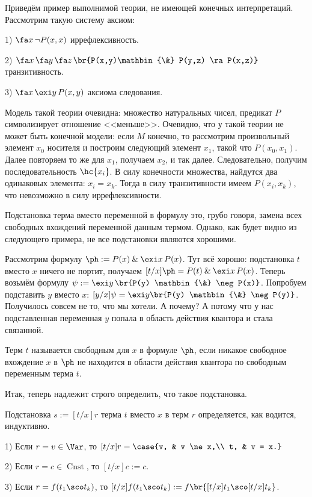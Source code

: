 \documentclass[a4paper,draft]{article}
\let\amper\&
\def\&{\mathbin{\amper}}
\def\exis#1{\exi#1\,}
\def\fora#1{\fa#1\,}
\DeclareMathOperator{\Cnst}{Cnst}
\begin{document}
\begin{ex}
  Приведём пример выполнимой теории, не имеющей конечных интерпретаций. Рассмотрим такую систему аксиом:

  1) $\fora{x} \neg P(x,x)$ иррефлексивность.

  2) $\fora{x}\fora{y}\fora{z} \br{P(x,y)\& P(y,z) \ra P(x,z)}$ транзитивность.

  3) $\fora{x}\exis{y} P(x,y)$ аксиома следования.

  Модель такой теории очевидна: множество натуральных чисел, предикат $P$ символизирует отношение <<меньше>>.
  Очевидно, что у такой теории не может быть конечной модели: если $M$ конечно, то рассмотрим произвольный элемент $x_0$
  носителя и построим следующий элемент $x_1$, такой что $P(x_0,x_1)$. Далее повторяем то же для $x_1$,
  получаем $x_2$, и так далее. Следовательно, получим последовательность $\hc{x_i}$. В силу конечности множества,
  найдутся два одинаковых элемента: $x_i = x_k$. Тогда в силу транзитивности имеем $P(x_i, x_k)$,
  что невозможно в силу иррефлексивности.
\end{ex}


Подстановка терма вместо переменной в формулу это, грубо говоря, замена всех свободных
вхождений переменной данным термом. Однако, как будет видно из следующего примера,
не все подстановки являются хорошими.

\begin{ex}
  Рассмотрим формулу $\ph := P(x) \& \exis{x} P(x)$. Тут всё хорошо: подстановка $t$ вместо $x$ ничего не портит,
  получаем $[t/x] \ph = P(t) \& \exis{x} P(x)$.   Теперь возьмём формулу $\psi := \exis{y}\br{P(y) \& \neg P(x)}$.
  Попробуем подставить $y$ вместо $x$: $[y/x]\psi = \exi y\br{P(y) \& \neg P(y)}$.
  Получилось совсем не то, что мы хотели. А почему? А потому что у нас подставленная переменная $y$ попала в область действия
  квантора и стала связанной.
\end{ex}

\begin{df}
  Терм $t$ называется свободным для $x$ в формуле $\ph$, если никакое свободное вхождение $x$ в $\ph$
  не находится в области действия квантора по свободным переменным терма $t$.
\end{df}

Итак, теперь надлежит строго определить, что такое подстановка.

\begin{df}
  Подстановка $s := [t/x]r$ терма $t$ вместо $x$ в терм $r$ определяется, как водится, индуктивно.

  1) Если $r = v \in \Var$, то $[t/x]r = \case{v, & v \ne x,\\ t, & v = x.}$

  2) Если $r = c \in \Cnst$, то $[t/x]c := c$.

  3) Если $r = f(t_1\sco t_k)$, то $[t/x]f(t_1\sco t_k) := f\br{[t/x] t_1\sco [t/x] t_k}$.
\end{df}
\end{document}
